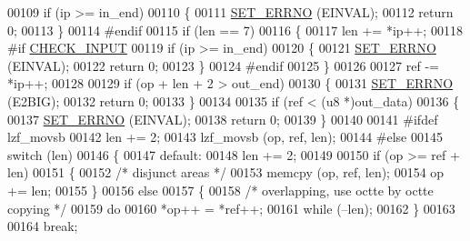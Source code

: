\begin{DoxyCode}
00109           \textcolor{keywordflow}{if} (ip >= in\_end)
00110             \{
00111               \hyperlink{lzf__d_8c_a9539a5281f41104073dfbcb2ebf35f9d}{SET\_ERRNO} (EINVAL);
00112               \textcolor{keywordflow}{return} 0;
00113             \}
00114 \textcolor{preprocessor}{#}\textcolor{preprocessor}{endif}
00115           \textcolor{keywordflow}{if} (len == 7)
00116             \{
00117               len += *ip++;
00118 \textcolor{preprocessor}{#}\textcolor{preprocessor}{if} \hyperlink{lzfP_8h_a1a4fde3dbdd8e8f920a325f551fcfd94}{CHECK\_INPUT}
00119               \textcolor{keywordflow}{if} (ip >= in\_end)
00120                 \{
00121                   \hyperlink{lzf__d_8c_a9539a5281f41104073dfbcb2ebf35f9d}{SET\_ERRNO} (EINVAL);
00122                   \textcolor{keywordflow}{return} 0;
00123                 \}
00124 \textcolor{preprocessor}{#}\textcolor{preprocessor}{endif}
00125             \}
00126 
00127           ref -= *ip++;
00128 
00129           \textcolor{keywordflow}{if} (op + len + 2 > out\_end)
00130             \{
00131               \hyperlink{lzf__d_8c_a9539a5281f41104073dfbcb2ebf35f9d}{SET\_ERRNO} (E2BIG);
00132               \textcolor{keywordflow}{return} 0;
00133             \}
00134 
00135           \textcolor{keywordflow}{if} (ref < (u8 *)out\_data)
00136             \{
00137               \hyperlink{lzf__d_8c_a9539a5281f41104073dfbcb2ebf35f9d}{SET\_ERRNO} (EINVAL);
00138               \textcolor{keywordflow}{return} 0;
00139             \}
00140 
00141 \textcolor{preprocessor}{#}\textcolor{preprocessor}{ifdef} \textcolor{preprocessor}{lzf\_movsb}
00142           len += 2;
00143           lzf\_movsb (op, ref, len);
00144 \textcolor{preprocessor}{#}\textcolor{preprocessor}{else}
00145           \textcolor{keywordflow}{switch} (len)
00146             \{
00147               \textcolor{keywordflow}{default}:
00148                 len += 2;
00149 
00150                 \textcolor{keywordflow}{if} (op >= ref + len)
00151                   \{
00152                     \textcolor{comment}{/* disjunct areas */}
00153                     memcpy (op, ref, len);
00154                     op += len;
00155                   \}
00156                 \textcolor{keywordflow}{else}
00157                   \{
00158                     \textcolor{comment}{/* overlapping, use octte by octte copying */}
00159                     \textcolor{keywordflow}{do}
00160                       *op++ = *ref++;
00161                     \textcolor{keywordflow}{while} (--len);
00162                   \}
00163 
00164                 \textcolor{keywordflow}{break};

\end{DoxyCode}
